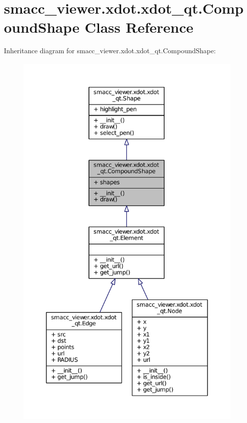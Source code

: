 \hypertarget{classsmacc__viewer_1_1xdot_1_1xdot__qt_1_1CompoundShape}{}\section{smacc\+\_\+viewer.\+xdot.\+xdot\+\_\+qt.\+Compound\+Shape Class Reference}
\label{classsmacc__viewer_1_1xdot_1_1xdot__qt_1_1CompoundShape}


Inheritance diagram for smacc\+\_\+viewer.\+xdot.\+xdot\+\_\+qt.\+Compound\+Shape\+:
\nopagebreak
\begin{figure}[H]
\begin{center}
\leavevmode
\includegraphics[height=550pt]{classsmacc__viewer_1_1xdot_1_1xdot__qt_1_1CompoundShape__inherit__graph}
\end{center}
\end{figure}


